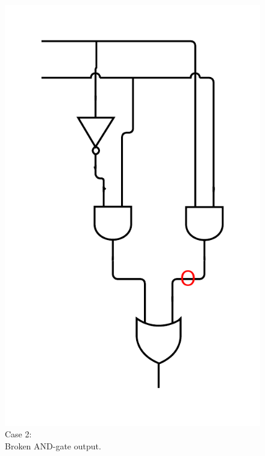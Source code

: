 \documentclass[10pt,a4paper]{scrartcl}
\begin{document}
\begin{figure}[h]
  \centering\includegraphics[width=\linewidth]{images/exercise_6_2_and_output.png}
  \caption{Case 2:\\ Broken AND-gate output.}
  \endminipage

\end{figure}
\end{document}
